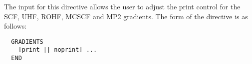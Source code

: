 %
%
\label{sec:scfgrad}


The input for this directive allows the user to adjust the print control
for the SCF, UHF, ROHF, MCSCF and MP2 gradients.  The
form of the directive is as follows:


\begin{verbatim}
  GRADIENTS 
    [print || noprint] ...
  END
\end{verbatim}






